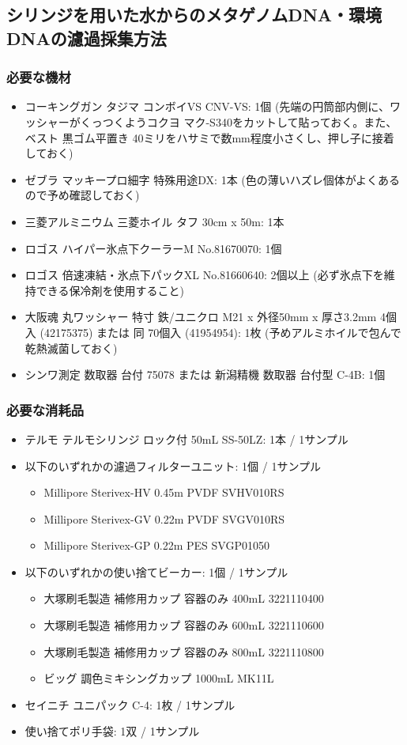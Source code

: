 \documentclass[titlepage,10pt,a4paper,uplatex]{jsbook}
\begin{document}
\subsection{シリンジを用いた水からのメタゲノムDNA・環境DNAの濾過採集方法}

\subsubsection{必要な機材}
\begin{itemize}
\item コーキングガン タジマ コンボイVS CNV-VS: 1個 (先端の円筒部内側に、ワッシャーがくっつくようコクヨ マク-S340をカットして貼っておく。また、ベスト 黒ゴム平置き 40ミリをハサミで数mm程度小さくし、押し子に接着しておく)
\item ゼブラ マッキープロ細字 特殊用途DX: 1本 (色の薄いハズレ個体がよくあるので予め確認しておく)
\item 三菱アルミニウム 三菱ホイル タフ 30cm x 50m: 1本
\item ロゴス ハイパー氷点下クーラーM No.81670070: 1個
\item ロゴス 倍速凍結・氷点下パックXL No.81660640: 2個以上 (必ず氷点下を維持できる保冷剤を使用すること)
\item 大阪魂 丸ワッシャー 特寸 鉄/ユニクロ M21 x 外径50mm x 厚さ3.2mm 4個入 (42175375) または 同 70個入 (41954954): 1枚 (予めアルミホイルで包んで乾熱滅菌しておく)
\item シンワ測定 数取器 台付 75078 または 新潟精機 数取器 台付型 C-4B: 1個
\end{itemize}

\subsubsection{必要な消耗品}
\begin{itemize}
\item テルモ テルモシリンジ ロック付 50mL SS-50LZ: 1本 / 1サンプル
\item 以下のいずれかの濾過フィルターユニット: 1個 / 1サンプル
\begin{itemize}
\item Millipore Sterivex-HV 0.45{\textmu}m PVDF SVHV010RS
\item Millipore Sterivex-GV 0.22{\textmu}m PVDF SVGV010RS
\item Millipore Sterivex-GP 0.22{\textmu}m PES SVGP01050
\end{itemize}
\item 以下のいずれかの使い捨てビーカー: 1個 / 1サンプル
\begin{itemize}
\item 大塚刷毛製造 補修用カップ 容器のみ 400mL 3221110400
\item 大塚刷毛製造 補修用カップ 容器のみ 600mL 3221110600
\item 大塚刷毛製造 補修用カップ 容器のみ 800mL 3221110800
\item ビッグ 調色ミキシングカップ 1000mL MK11L
\end{itemize}
\item セイニチ ユニパック C-4: 1枚 / 1サンプル
\item 使い捨てポリ手袋: 1双 / 1サンプル
\end{itemize}
\end{document}
